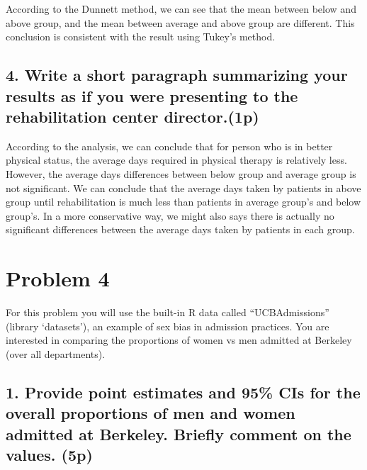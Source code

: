 \documentclass[]{article}
\newenvironment{Shaded}{\begin{snugshade}}{\end{snugshade}}
\newcommand{\KeywordTok}[1]{\textcolor[rgb]{0.13,0.29,0.53}{\textbf{#1}}}
\newcommand{\StringTok}[1]{\textcolor[rgb]{0.31,0.60,0.02}{#1}}
\newcommand{\OperatorTok}[1]{\textcolor[rgb]{0.81,0.36,0.00}{\textbf{#1}}}
\newcommand{\NormalTok}[1]{#1}
\begin{document}
According to the Dunnett method, we can see that the mean between below
and above group, and the mean between average and above group are
different. This conclusion is consistent with the result using Tukey's
method.

\subsection{4. Write a short paragraph summarizing your results as if
you were presenting to the rehabilitation center
director.(1p)}\label{write-a-short-paragraph-summarizing-your-results-as-if-you-were-presenting-to-the-rehabilitation-center-director.1p}

According to the analysis, we can conclude that for person who is in
better physical status, the average days required in physical therapy is
relatively less. However, the average days differences between below
group and average group is not significant. We can conclude that the
average days taken by patients in above group until rehabilitation is
much less than patients in average group's and below group's. In a more
conservative way, we might also says there is actually no significant
differences between the average days taken by patients in each group.

\section{Problem 4}\label{problem-4}

For this problem you will use the built-in R data called
``UCBAdmissions'' (library `datasets'), an example of sex bias in
admission practices. You are interested in comparing the proportions of
women vs men admitted at Berkeley (over all departments).

\subsection{1. Provide point estimates and 95\% CIs for the overall
proportions of men and women admitted at Berkeley. Briefly comment on
the values.
(5p)}\label{provide-point-estimates-and-95-cis-for-the-overall-proportions-of-men-and-women-admitted-at-berkeley.-briefly-comment-on-the-values.-5p}

\begin{Shaded}
\end{Shaded}
\end{document}
